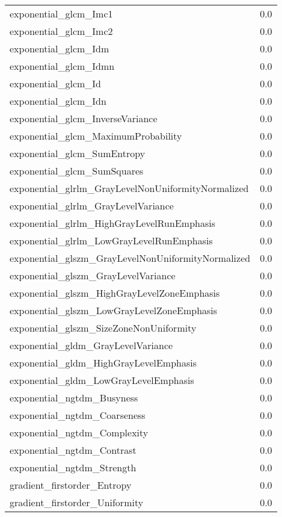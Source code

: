 {\begin{xltabular}[H]{\textwidth}{X r}
        exponential\_glcm\_Imc1 & 0.0 \\
        exponential\_glcm\_Imc2 & 0.0 \\
        exponential\_glcm\_Idm & 0.0 \\
        exponential\_glcm\_Idmn & 0.0 \\
        exponential\_glcm\_Id & 0.0 \\
        exponential\_glcm\_Idn & 0.0 \\
        exponential\_glcm\_InverseVariance & 0.0 \\
        exponential\_glcm\_MaximumProbability & 0.0 \\
        exponential\_glcm\_SumEntropy & 0.0 \\
        exponential\_glcm\_SumSquares & 0.0 \\
        exponential\_glrlm\_GrayLevelNonUniformityNormalized & 0.0 \\
        exponential\_glrlm\_GrayLevelVariance & 0.0 \\
        exponential\_glrlm\_HighGrayLevelRunEmphasis & 0.0 \\
        exponential\_glrlm\_LowGrayLevelRunEmphasis & 0.0 \\
        exponential\_glszm\_GrayLevelNonUniformityNormalized & 0.0 \\
        exponential\_glszm\_GrayLevelVariance & 0.0 \\
        exponential\_glszm\_HighGrayLevelZoneEmphasis & 0.0 \\
        exponential\_glszm\_LowGrayLevelZoneEmphasis & 0.0 \\
        exponential\_glszm\_SizeZoneNonUniformity & 0.0 \\
        exponential\_gldm\_GrayLevelVariance & 0.0 \\
        exponential\_gldm\_HighGrayLevelEmphasis & 0.0 \\
        exponential\_gldm\_LowGrayLevelEmphasis & 0.0 \\
        exponential\_ngtdm\_Busyness & 0.0 \\
        exponential\_ngtdm\_Coarseness & 0.0 \\
        exponential\_ngtdm\_Complexity & 0.0 \\
        exponential\_ngtdm\_Contrast & 0.0 \\
        exponential\_ngtdm\_Strength & 0.0 \\
        gradient\_firstorder\_Entropy & 0.0 \\
        gradient\_firstorder\_Uniformity & 0.0 \\

\end{xltabular}}
